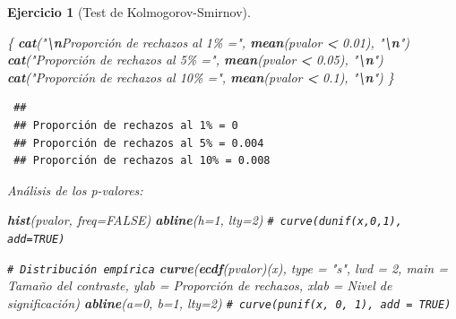 \documentclass[
  spanish,
  10pt,
]{book}
\newenvironment{Shaded}{\begin{snugshade}}{\end{snugshade}}
\newcommand{\AttributeTok}[1]{\textcolor[rgb]{0.13,0.29,0.53}{#1}}
\newcommand{\CommentTok}[1]{\textcolor[rgb]{0.56,0.35,0.01}{\textit{#1}}}
\newcommand{\ConstantTok}[1]{\textcolor[rgb]{0.56,0.35,0.01}{#1}}
\newcommand{\DecValTok}[1]{\textcolor[rgb]{0.00,0.00,0.81}{#1}}
\newcommand{\FloatTok}[1]{\textcolor[rgb]{0.00,0.00,0.81}{#1}}
\newcommand{\FunctionTok}[1]{\textcolor[rgb]{0.13,0.29,0.53}{\textbf{#1}}}
\newcommand{\NormalTok}[1]{#1}
\newcommand{\SpecialCharTok}[1]{\textcolor[rgb]{0.81,0.36,0.00}{\textbf{#1}}}
\newcommand{\StringTok}[1]{\textcolor[rgb]{0.31,0.60,0.02}{#1}}
\theoremstyle{break}
\newtheorem{exercise}{Ejercicio}[chapter]
\theoremstyle{nonumberplain}
\renewcommand{\CommentTok}[1]{\textcolor[rgb]{0.41,0.41,0.41}{\texttt{#1}}}
\begin{document}
\begin{exercise}[Test de Kolmogorov-Smirnov]
\begin{enumerate}
\begin{Shaded}
\begin{Highlighting}[]
\NormalTok{\{}
  \FunctionTok{cat}\NormalTok{(}\StringTok{"}\SpecialCharTok{\textbackslash{}n}\StringTok{Proporción de rechazos al 1\% ="}\NormalTok{, }\FunctionTok{mean}\NormalTok{(pvalor }\SpecialCharTok{\textless{}} \FloatTok{0.01}\NormalTok{), }\StringTok{"}\SpecialCharTok{\textbackslash{}n}\StringTok{"}\NormalTok{)}
  \FunctionTok{cat}\NormalTok{(}\StringTok{"Proporción de rechazos al 5\% ="}\NormalTok{, }\FunctionTok{mean}\NormalTok{(pvalor }\SpecialCharTok{\textless{}} \FloatTok{0.05}\NormalTok{), }\StringTok{"}\SpecialCharTok{\textbackslash{}n}\StringTok{"}\NormalTok{)}
  \FunctionTok{cat}\NormalTok{(}\StringTok{"Proporción de rechazos al 10\% ="}\NormalTok{, }\FunctionTok{mean}\NormalTok{(pvalor }\SpecialCharTok{\textless{}} \FloatTok{0.1}\NormalTok{), }\StringTok{"}\SpecialCharTok{\textbackslash{}n}\StringTok{"}\NormalTok{)}
\NormalTok{\}}
\end{Highlighting}
\end{Shaded}

\begin{verbatim}
 ## 
 ## Proporción de rechazos al 1% = 0 
 ## Proporción de rechazos al 5% = 0.004 
 ## Proporción de rechazos al 10% = 0.008
\end{verbatim}

  Análisis de los p-valores:

\begin{Shaded}
\begin{Highlighting}[]
\FunctionTok{hist}\NormalTok{(pvalor, }\AttributeTok{freq=}\ConstantTok{FALSE}\NormalTok{)}
\FunctionTok{abline}\NormalTok{(}\AttributeTok{h=}\DecValTok{1}\NormalTok{, }\AttributeTok{lty=}\DecValTok{2}\NormalTok{)   }\CommentTok{\# curve(dunif(x,0,1), add=TRUE)}

\CommentTok{\# Distribución empírica}
\FunctionTok{curve}\NormalTok{(}\FunctionTok{ecdf}\NormalTok{(pvalor)(x), }\AttributeTok{type =} \StringTok{"s"}\NormalTok{, }\AttributeTok{lwd =} \DecValTok{2}\NormalTok{, }
      \AttributeTok{main =} \StringTok{\textquotesingle{}Tamaño del contraste\textquotesingle{}}\NormalTok{, }\AttributeTok{ylab =} \StringTok{\textquotesingle{}Proporción de rechazos\textquotesingle{}}\NormalTok{, }
      \AttributeTok{xlab =} \StringTok{\textquotesingle{}Nivel de significación\textquotesingle{}}\NormalTok{)}
\FunctionTok{abline}\NormalTok{(}\AttributeTok{a=}\DecValTok{0}\NormalTok{, }\AttributeTok{b=}\DecValTok{1}\NormalTok{, }\AttributeTok{lty=}\DecValTok{2}\NormalTok{)   }\CommentTok{\# curve(punif(x, 0, 1), add = TRUE) }
\end{Highlighting}
\end{Shaded}


\end{enumerate}
\end{exercise}
\end{document}
